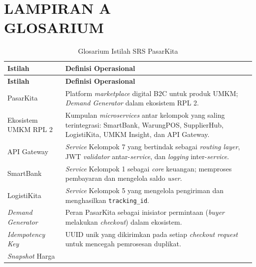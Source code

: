 
\section*{LAMPIRAN A \\ GLOSARIUM}
{}

\begin{longtable}{|L{4cm}|L{11cm}|}
    \caption{Glosarium Istilah SRS PasarKita}
    \label{tab:glosarium} \\
    \hline
    \textbf{Istilah} & \textbf{Definisi Operasional} \\
    \hline
    \endfirsthead
    \hline
    \textbf{Istilah} & \textbf{Definisi Operasional} \\
    \hline
    \endhead
    \hline
    \endfoot
    PasarKita
        & Platform \textit{marketplace} digital B2C untuk produk UMKM;
          \textit{Demand Generator} dalam ekosistem RPL 2. \\
    \hline
    Ekosistem UMKM RPL 2
        & Kumpulan \textit{microservices} antar kelompok yang saling terintegrasi:
          SmartBank, WarungPOS, SupplierHub, LogistiKita, UMKM Insight, dan API
          Gateway. \\
    \hline
    API Gateway
        & \textit{Service} Kelompok 7 yang bertindak sebagai \textit{routing layer},
          JWT \textit{validator} antar-\textit{service}, dan \textit{logging}
          inter-\textit{service}. \\
    \hline
    SmartBank
        & \textit{Service} Kelompok 1 sebagai \textit{core} keuangan; memproses
          pembayaran dan mengelola saldo \textit{user}. \\
    \hline
    LogistiKita
        & \textit{Service} Kelompok 5 yang mengelola pengiriman dan menghasilkan
          \texttt{tracking\_id}. \\
    \hline
    \textit{Demand Generator}
        & Peran PasarKita sebagai inisiator permintaan (\textit{buyer} melakukan
          \textit{checkout}) dalam ekosistem. \\
    \hline
    \textit{Idempotency Key}
        & UUID unik yang dikirimkan pada setiap \textit{checkout request} untuk
          mencegah pemrosesan duplikat. \\
    \hline
    \textit{Snapshot} Harga

\end{longtable}
